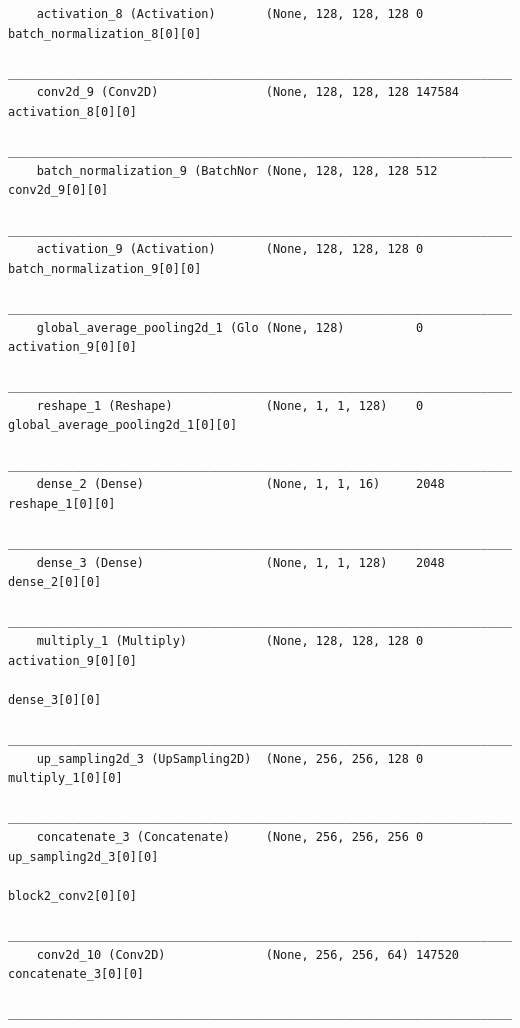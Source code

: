 {\begin{verbatim}
    activation_8 (Activation)       (None, 128, 128, 128 0           batch_normalization_8[0][0]      
    __________________________________________________________________________________________________
    conv2d_9 (Conv2D)               (None, 128, 128, 128 147584      activation_8[0][0]               
    __________________________________________________________________________________________________
    batch_normalization_9 (BatchNor (None, 128, 128, 128 512         conv2d_9[0][0]                   
    __________________________________________________________________________________________________
    activation_9 (Activation)       (None, 128, 128, 128 0           batch_normalization_9[0][0]      
    __________________________________________________________________________________________________
    global_average_pooling2d_1 (Glo (None, 128)          0           activation_9[0][0]               
    __________________________________________________________________________________________________
    reshape_1 (Reshape)             (None, 1, 1, 128)    0           global_average_pooling2d_1[0][0] 
    __________________________________________________________________________________________________
    dense_2 (Dense)                 (None, 1, 1, 16)     2048        reshape_1[0][0]                  
    __________________________________________________________________________________________________
    dense_3 (Dense)                 (None, 1, 1, 128)    2048        dense_2[0][0]                    
    __________________________________________________________________________________________________
    multiply_1 (Multiply)           (None, 128, 128, 128 0           activation_9[0][0]               
                                                                        dense_3[0][0]                    
    __________________________________________________________________________________________________
    up_sampling2d_3 (UpSampling2D)  (None, 256, 256, 128 0           multiply_1[0][0]                 
    __________________________________________________________________________________________________
    concatenate_3 (Concatenate)     (None, 256, 256, 256 0           up_sampling2d_3[0][0]            
                                                                        block2_conv2[0][0]               
    __________________________________________________________________________________________________
    conv2d_10 (Conv2D)              (None, 256, 256, 64) 147520      concatenate_3[0][0]              
    __________________________________________________________________________________________________

\end{verbatim}}
